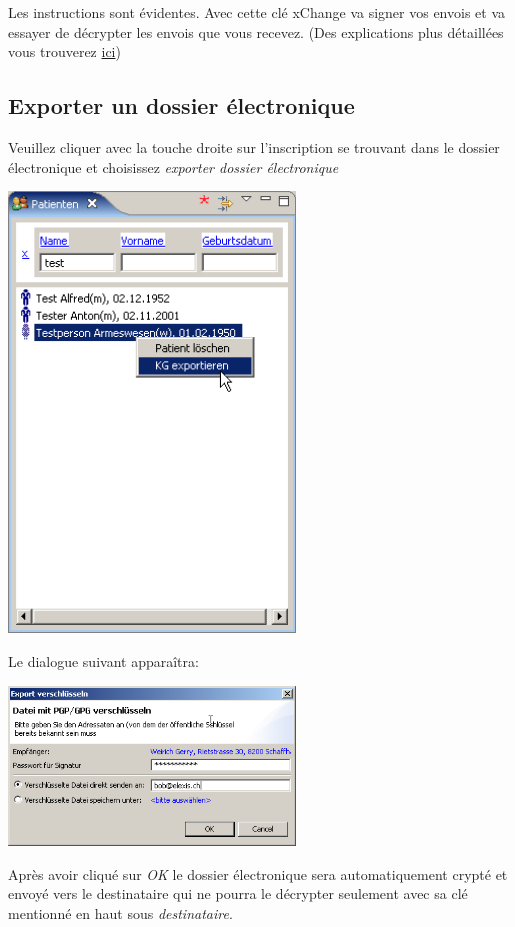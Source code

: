 Les instructions sont évidentes. Avec cette clé xChange va signer vos envois  et va essayer de décrypter les envois que vous recevez.
(Des explications plus détaillées vous trouverez \href{http://www.elexis.ch/jp/index.php?option=content&task=view&id=64}{ici})
\subsection{Exporter un dossier électronique}
Veuillez cliquer avec la touche droite sur l'inscription se trouvant dans le dossier électronique et choisissez  \textit{exporter dossier électronique}

\includegraphics[width=3in]{images/xc3.png}

 Le dialogue suivant apparaîtra:

\includegraphics[width=3in]{images/xc4.png}

Après avoir cliqué sur \textit{OK} le dossier électronique sera automatiquement crypté et envoyé vers le destinataire qui ne pourra le décrypter seulement avec sa clé mentionné en haut sous \textit{destinataire}.

